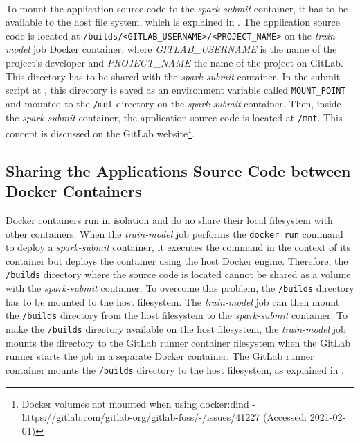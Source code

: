 \paragraph{}
To mount the application source code to the \textit{spark-submit} container, it has to be available to the host file system, which is explained in .
The application source code is located at \texttt{/builds/<GITLAB\_USERNAME>/<PROJECT\_NAME>} on the \textit{train-model} job Docker container, where \textit{GITLAB\_USERNAME} is the name of the project's developer and \textit{PROJECT\_NAME} the name of the project on GitLab. This directory has to be shared with the \textit{spark-submit} container.
%
In the submit script at , this directory is saved as an environment variable called \texttt{MOUNT\_POINT} and mounted to the \texttt{/mnt} directory on the \textit{spark-submit} container. Then, inside the \textit{spark-submit} container, the application source code is located at \texttt{/mnt}.
%
This concept is discussed on the GitLab website\footnote{Docker volumes not mounted when using docker:dind - \url{https://gitlab.com/gitlab-org/gitlab-foss/-/issues/41227} (Accessed: 2021-02-01)}.


\subsection{Sharing the Applications Source Code between Docker Containers}
\label{subsec:06_pipeline_share}
Docker containers run in isolation and do no share their local filesystem with other containers.
% 
When the \textit{train-model} job performs the \texttt{docker run} command to deploy a \textit{spark-submit} container, it executes the command in the context of its container but deploys the container using the host Docker engine. Therefore, the \texttt{/builds} directory where the source code is located cannot be shared as a volume with the \textit{spark-submit} container.
% 
To overcome this problem, the \texttt{/builds} directory has to be mounted to the host filesystem. The \textit{train-model} job can then mount the \texttt{/builds} directory from the host filesystem to the \textit{spark-submit} container.
%
To make the \texttt{/builds} directory available on the host filesystem, the \textit{train-model} job mounts the directory to the GitLab runner container filesystem when the GitLab runner starts the job in a separate Docker container. The GitLab runner container mounts the \texttt{/builds}  directory to the host filesystem, as explained in .
